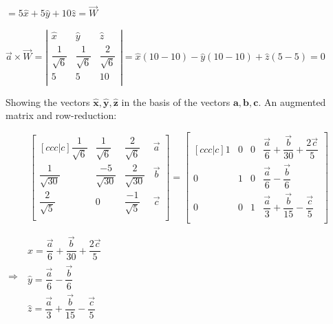 \documentclass[fleqn]{article}
\begin{document}
\begin{enumerate}
  $
  =
  5\hat{x}+5\hat{y}+10\hat{z}
  =\overrightarrow{W}
  $
  
  
  $
  \overrightarrow{a}\times\overrightarrow{W}
  =
  \left|
  \begin{matrix}
    \hat{x} & \hat{y} & \hat{z} \\
    \dfrac{1}{\sqrt{6}} & \dfrac{1}{\sqrt{6}} & \dfrac{2}{\sqrt{6}}  \\ 
    5 & 5 & 10 \\ 
  \end{matrix}
  \right|
  =
  \hat{x}(10-10)-\hat{y}(10-10)+\hat{z}(5-5)
  =
  0
  $
  
  Showing the vectors $\mathbf{\hat{x}}, \mathbf{\hat{y}}, \mathbf{\hat{z}}$ in the basis of the vectors $\mathbf{a}, \mathbf{b}, \mathbf{c}$. An augmented matrix and row-reduction:
  
  \makeatletter
  \renewcommand*\env@matrix[1][*\c@MaxMatrixCols c]{
    \hskip -\arraycolsep
    \let\@ifnextchar\new@ifnextchar
    \array{#1}}
  \makeatother
  \begin{equation}
    \begin{bmatrix}[ccc|c]
      \dfrac{1}{\sqrt{6}} & \dfrac{1}{\sqrt{6}} & \dfrac{2}{\sqrt{6}} & \overrightarrow{a} \\
      \dfrac{1}{\sqrt{30}} & \dfrac{-5}{\sqrt{30}} & \dfrac{2}{\sqrt{30}} & \overrightarrow{b} \\
      \dfrac{2}{\sqrt{5}} & 0 & \dfrac{-1}{\sqrt{5}}  & \overrightarrow{c} \\
    \end{bmatrix}
    =
    \begin{bmatrix}[ccc|c]
      1 & 0 & 0 & \dfrac{\overrightarrow{a}}{6}+\dfrac{\overrightarrow{b}}{30}+\dfrac{2\overrightarrow{c}}{5} \\
      0 & 1 & 0 & \dfrac{\overrightarrow{a}}{6}-\dfrac{\overrightarrow{b}}{6} \\
      0 & 0 & 1 & \dfrac{\overrightarrow{a}}{3}+\dfrac{\overrightarrow{b}}{15}-\dfrac{\overrightarrow{c}}{5} \\
    \end{bmatrix}
  \end{equation}
  
  
  $\Rightarrow$ 
  $
  \begin{array}{lll}
    \hat{x}= \dfrac{\overrightarrow{a}}{6}+\dfrac{\overrightarrow{b}}{30}+\dfrac{2\overrightarrow{c}}{5} \\
    \hat{y}= \dfrac{\overrightarrow{a}}{6}-\dfrac{\overrightarrow{b}}{6} \\
    \hat{z}= \dfrac{\overrightarrow{a}}{3}+\dfrac{\overrightarrow{b}}{15}-\dfrac{\overrightarrow{c}}{5}
  \end{array}  
  $
  

\end{enumerate}
\end{document}
